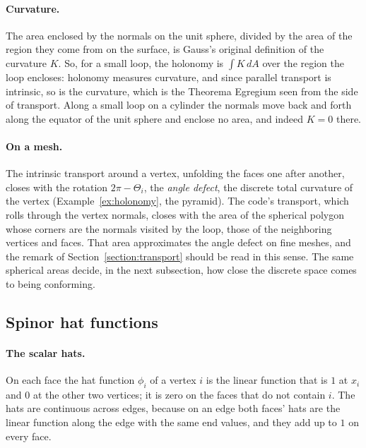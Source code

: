 \paragraph{Curvature.} The area enclosed by the normals on the unit sphere, divided by the area of the region they come from on the surface, is Gauss's original definition of the curvature $K$. So, for a small loop, the holonomy is $\int K\, dA$ over the region the loop encloses: holonomy measures curvature, and since parallel transport is intrinsic, so is the curvature, which is the Theorema Egregium seen from the side of transport. Along a small loop on a cylinder the normals move back and forth along the equator of the unit sphere and enclose no area, and indeed $K = 0$ there.

\paragraph{On a mesh.} The intrinsic transport around a vertex, unfolding the faces one after another, closes with the rotation $2\pi - \Theta_i$, the \emph{angle defect}, the discrete total curvature of the vertex (Example~\ref{ex:holonomy}, the pyramid). The code's transport, which rolls through the vertex normals, closes with the area of the spherical polygon whose corners are the normals visited by the loop, those of the neighboring vertices and faces. That area approximates the angle defect on fine meshes, and the remark of Section~\ref{section:transport} should be read in this sense. The same spherical areas decide, in the next subsection, how close the discrete space comes to being conforming.

\subsection{Spinor hat functions}

\paragraph{The scalar hats.} On each face the hat function $\phi_i$ of a vertex $i$ is the linear function that is $1$ at $x_i$ and $0$ at the other two vertices; it is zero on the faces that do not contain $i$. The hats are continuous across edges, because on an edge both faces' hats are the linear function along the edge with the same end values, and they add up to $1$ on every face.

